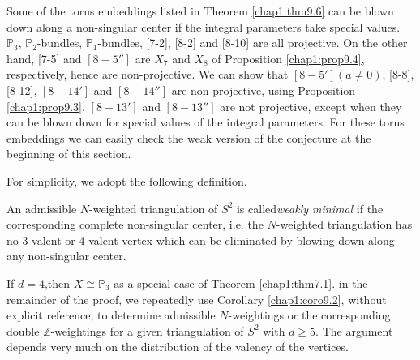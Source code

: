 \begin{remark*}
Some of the torus embeddings listed in Theorem \ref{chap1:thm9.6} can
be blown down 
along a non-singular center if the integral parameters take special
values. $\mathbb{P}_3$, $\mathbb{P}_2$-bundles,
$\mathbb{P}_1$-bundles, [7-2], [8-2] and [8-10] are all
projective. On the other hand, [7-5] and $[8-5'']$ are $X_7$ and
$X_8$ of Proposition \ref{chap1:prop9.4}, respectively, hence are
non-projective. We 
can show that $[8-5'] (a \neq 0)$,  [8-8], [8-12], $[8-14']$ and
$[8-14'']$ are non-projective, using Proposition
\ref{chap1:prop9.3}. $[8-13']$ and 
$[8-13'']$ are not projective, except when they can be blown down for
special values of the integral parameters. For these torus embeddings
we can easily check the weak version of the conjecture at the
beginning of this section. 
\end{remark*}

	For simplicity, we adopt the following definition. 

	\begin{defi*}
 An admissible $N$-weighted triangulation of
 $S^2$ is called\break \textit{weakly minimal} if the corresponding
 complete non-singular center, i.e. the $N$-weighted
 triangulation has no 3-valent or 4-valent vertex which
 can be eliminated by blowing down along any non-singular
 center. 
	\end{defi*}

\setcounter{proofofthm}{5}	
\begin{proofofthm} %
If $d=4$,\pageoriginale then $X \cong \mathbb{P}_3$ as a special case
of Theorem \ref{chap1:thm7.1}. in the remainder of the proof, we repeatedly use
Corollary \ref{chap1:coro9.2}, without explicit reference, to determine admissible
$N$-weightings or the corresponding double $\mathbb{Z}$-weightings for
a given triangulation of $S^2$ with $d \geq 5$. The argument depends
very much on the distribution of the valency of the vertices.  
\end{proofofthm}

